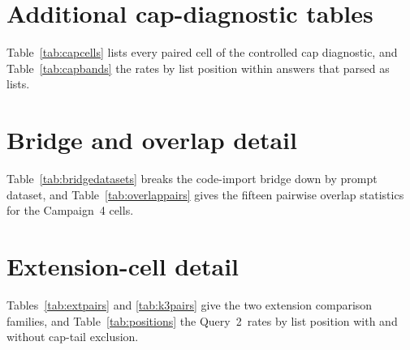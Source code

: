 \documentclass[10pt,twocolumn,letterpaper]{article}
\newcommand{\qtwo}{Query~2}
\begin{document}
\section{Additional cap-diagnostic tables}
\label{app:cap}

Table~\ref{tab:capcells} lists every paired cell of the controlled cap diagnostic, and
Table~\ref{tab:capbands} the rates by list position within answers that parsed as lists.




\section{Bridge and overlap detail}
\label{app:bridge}

Table~\ref{tab:bridgedatasets} breaks the code-import bridge down by prompt dataset, and
Table~\ref{tab:overlappairs} gives the fifteen pairwise overlap statistics for the Campaign~4 cells.




\section{Extension-cell detail}
\label{app:extension}

Tables~\ref{tab:extpairs} and \ref{tab:k3pairs} give the two extension comparison families, and
Table~\ref{tab:positions} the \qtwo\ rates by list position with and without cap-tail exclusion.




\end{document}
